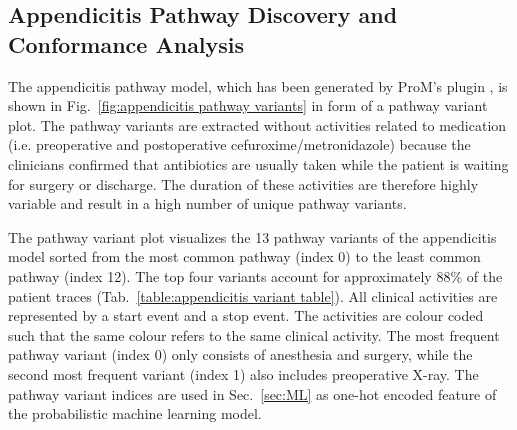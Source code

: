 \subsection{Appendicitis Pathway Discovery and Conformance Analysis}
\label{Sec:DiscoveryConformance}
The appendicitis pathway model, which has been generated by ProM's
plugin , is shown in
Fig.~\ref{fig:appendicitis pathway variants} in form of a pathway
variant plot.
The pathway variants are extracted without activities related to medication (i.e. preoperative and postoperative cefuroxime/metronidazole) because the clinicians confirmed that antibiotics are usually taken while the patient is waiting for surgery or discharge. The duration of these activities are therefore highly variable and result in a high number of unique pathway variants.

The pathway variant plot visualizes the 13 pathway variants of the
appendicitis model sorted from the most common pathway (index 0) to
the least common pathway (index 12).
The top four variants account for approximately 88\% of the patient
traces (Tab.~\ref{table:appendicitis variant table}).
All clinical activities are represented by a start event and a stop
event.
The activities are colour coded such that the same colour refers to the same clinical activity. The most frequent pathway variant (index 0) only consists of anesthesia and surgery, while the second most frequent variant (index 1) also includes preoperative X-ray.
The pathway variant indices are used in Sec.~\ref{sec:ML} as one-hot
encoded feature of the probabilistic machine learning model.

